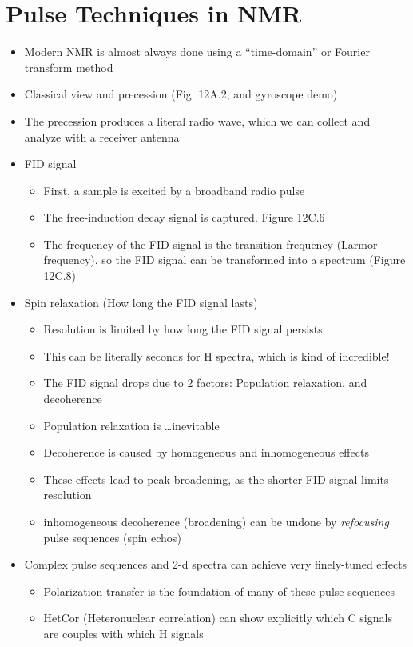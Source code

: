 \documentclass[12pt, openany, letterpaper]{memoir}
\begin{document}
\section{Pulse Techniques in NMR}
\begin{itemize}
	\item Modern NMR is almost always done using a ``time-domain'' or Fourier transform method
	\item Classical view and precession (Fig. 12A.2, and gyroscope demo)
	\item The precession produces a literal radio wave, which we can collect and analyze with a receiver antenna
	\item FID signal
	\begin{itemize}
		\item First, a sample is excited by a broadband radio pulse
		\item The free-induction decay signal is captured. Figure 12C.6
		\item The frequency of the FID signal is the transition frequency (Larmor frequency), so the FID signal can be transformed into a spectrum (Figure 12C.8)
	\end{itemize}
	\item Spin relaxation (How long the FID signal lasts)
	\begin{itemize}
		\item Resolution is limited by how long the FID signal persists
		\item This can be literally seconds for H spectra, which is kind of incredible!
		\item The FID signal drops due to 2 factors: Population relaxation, and decoherence
		\item Population relaxation is \ldots inevitable
		\item Decoherence is caused by homogeneous and inhomogeneous effects
		\item These effects lead to peak broadening, as the shorter FID signal limits resolution
		\item inhomogeneous decoherence (broadening) can be undone by \emph{refocusing} pulse sequences (spin echos)
	\end{itemize}
	\item Complex pulse sequences and 2-d spectra can achieve very finely-tuned effects
	\begin{itemize}
		\item Polarization transfer is the foundation of many of these pulse sequences
		\item HetCor (Heteronuclear correlation) can show explicitly which C signals are couples with which H signals

\end{itemize}
\end{itemize}
\end{document}
